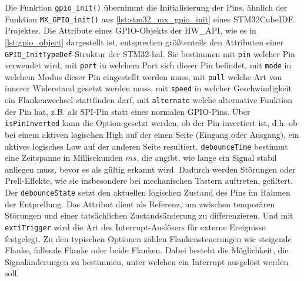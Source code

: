 Die Funktion \texttt{gpio\_init()} übernimmt die Initialisierung der Pins, ähnlich der Funktion \texttt{MX\_GPIO\_init()} aus \cref{lst:stm32_mx_gpio_init} eines STM32CubeIDE Projektes.
Die Attribute eines GPIO-Objekts der HW\_API, wie es in \cref{lst:gpio_object} dargestellt ist, entsprechen größtenteils den Attributen einer \texttt{GPIO\_InitTypeDef}-Struktur der STM32-\gls{hal}.
Sie bestimmen mit \texttt{pin} welcher Pin verwendet wird, mit \texttt{port} in welchem Port sich dieser Pin befindet, mit \texttt{mode} in welchem Modus dieser Pin eingestellt werden muss, mit \texttt{pull} welche Art von innerer Widerstand gesetzt werden muss, mit \texttt{speed} in welcher Geschwindigkeit ein Flankenwechsel stattfinden darf, mit \texttt{alternate} welche alternative Funktion der Pin hat, z.B. als SPI-Pin statt eines normalen GPIO-Pins.
Über \texttt{isPinInverted} kann die Option gesetzt werden, ob der Pin invertiert ist, d.h. ob bei einem aktiven logischen High auf der einen Seite (Eingang oder Ausgang), ein aktives logisches Low auf der anderen Seite resultiert.
\texttt{debounceTime} bestimmt eine Zeitspanne in Millisekunden $ms$, die angibt, wie lange ein Signal stabil anliegen muss, bevor es als gültig erkannt wird. 
Dadurch werden Störungen oder Prell-Effekte, wie sie insbesondere bei mechanischen Tastern auftreten, gefiltert.
Der \texttt{debounceState} setzt den aktuellen logischen Zustand des Pins im Rahmen der Entprellung. 
Das Attribut dient als Referenz, um zwischen temporären Störungen und einer tatsächlichen Zustandsänderung zu differenzieren.
Und mit \texttt{extiTrigger} wird die Art des Interrupt-Auslösers für externe Ereignisse festgelegt. 
Zu den typischen Optionen zählen Flankensteuerungen wie steigende Flanke, fallende Flanke oder beide Flanken. 
Dabei besteht die Möglichkeit, die Signaländerungen zu bestimmen, unter welchen ein Interrupt ausgelöst werden soll.

